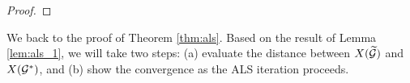 \begin{proof}
\begin{comment}
We investigate a lower bound of $\|\mathfrak{X}(\Delta_k)\|^2$.
Preliminarily, we consider the following inequality
\begin{align*}
	&(\hat{G}_k - G_k^*) \times_2 G^*_{<k} \times_3 G^*_{k<}	 \\
	&=(\hat{G}_k - G_k^*) \times_2 \tilde{G}_{<k} \times_3 \tilde{G}_{k<} + (\hat{G}_k - G_k^*) \times_2 (G_{<k}^* - \tilde{G}_{<k}) \times_3 \tilde{G}_{k<} \\
	& \quad + (\hat{G}_k - G_k^*) \times_2 \tilde{G}_{<k} \times_3 (G_{k<}^* - \tilde{G}_{k<}) + (\hat{G}_k - G_k^*) \times_2 (G_{<k}^* - \tilde{G}_{<k})  \times_3 (G_{k<}^* - \tilde{G}_{k<}),
\end{align*}
then the linear operator $\mathfrak{X}$ satisfies the following equation
\begin{align*}
	&\mathfrak{X}((\hat{G}_k - G_k^*) \times_2 G^*_{<k} \times_3 G^*_{k<})	 \\
	&=\mathfrak{X}((\hat{G}_k - G_k^*) \times_2 (G_{<k}^* - \tilde{G}_{<k}) \times_3 \tilde{G}_{k<})  + \mathfrak{X}((\hat{G}_k - G_k^*) \times_2 \tilde{G}_{<k} \times_3 (G_{k<}^* - \tilde{G}_{k<}))\\
	& \quad + \mathfrak{X}(\Delta_k) + \mathfrak{X}((\hat{G}_k - G_k^*) \times_2 (G_{<k}^* - \tilde{G}_{<k})  \times_3 (G_{k<}^* - \tilde{G}_{k<})).
\end{align*}
Here, we define 
\begin{align*}
	\Delta_k^* := (\hat{G}_k - G_k^*) \times_2 G^*_{<k} \times_3 G^*_{k<},
\end{align*}
then the triangle inequality yields
\begin{align*}
	&\|\mathfrak{X}(\Delta_k^*)\| \leq  \|\mathfrak{X}(\Delta_k)\| \\
	& \quad + \|\mathfrak{X}((\hat{G}_k - G_k^*) \times_2 (G_{<k}^* - \tilde{G}_{<k}) \times_3 \tilde{G}_{k<})\|  + \|\mathfrak{X}((\hat{G}_k - G_k^*) \times_2 \tilde{G}_{<k} \times_3 (G_{k<}^* - \tilde{G}_{k<})) \|\\
	& \quad  + \|\mathfrak{X}((\hat{G}_k - G_k^*) \times_2 (G_{<k}^* - \tilde{G}_{<k})  \times_3 (G_{k<}^* - \tilde{G}_{k<}))\|.
\end{align*}
\end{comment}

\end{proof}

We back to the proof of Theorem \ref{thm:als}.
Based on the result of Lemma \ref{lem:als_1}, we will take two steps: (a) evaluate the distance between $X(\widetilde{\mathcal{G}})$ and $X(\mathcal{G}^*)$, and (b) show the convergence as the ALS iteration proceeds. 



